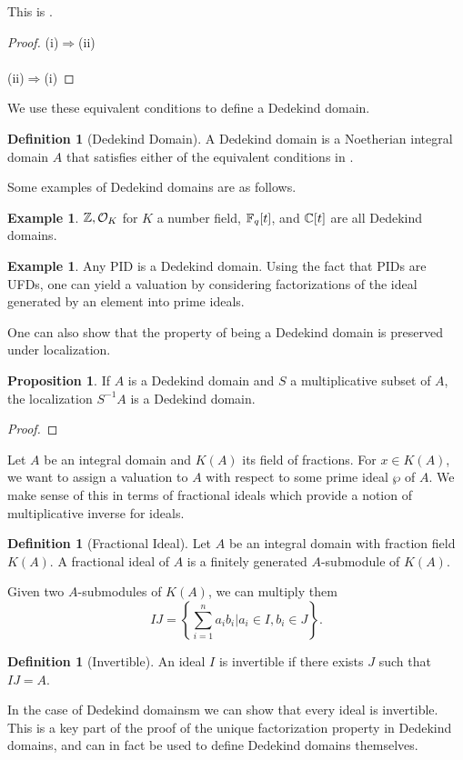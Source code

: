\documentclass{amsart}
\theoremstyle{definition}
\newtheorem{example}[theorem]{Example}
\newtheorem{proposition}[theorem]{Proposition}
\newtheorem{definition}[theorem]{Definition}
\numberwithin{equation}{section}
\begin{document}
This is \cite[Ch. 1, \S 1, Prop. 4]{Serre}. 
\begin{proof}
  (i)$\Longrightarrow$(ii)
  \\\\
  (ii)$\Longrightarrow$(i)
\end{proof}
We use these equivalent conditions to define a Dedekind domain. 
\begin{definition}[Dedekind Domain]
  A Dedekind domain is a Noetherian integral domain $A$ that satisfies either of the equivalent conditions in . 
\end{definition}
Some examples of Dedekind domains are as follows. 
\begin{example}
  $\mathbb{Z}, \mathcal{O}_{K}$ for $K$ a number field, $\mathbb{F}_{q}[t]$, and $\mathbb{C}[t]$ are all Dedekind domains. 
\end{example}
\begin{example}
  Any PID is a Dedekind domain. Using the fact that PIDs are UFDs, one can yield a valuation by considering factorizations of the ideal generated by an element into prime ideals. 
\end{example}
One can also show that the property of being a Dedekind domain is preserved under localization. 
\begin{proposition}
  If $A$ is a Dedekind domain and $S$ a multiplicative subset of $A$, the localization $S^{-1}A$ is a Dedekind domain. 
\end{proposition}
\begin{proof}
  
\end{proof}
Let $A$ be an integral domain and $K(A)$ its field of fractions. For $x\in K(A)$, we want to assign a valuation to $A$ with respect to some prime ideal $\wp$ of $A$. We make sense of this in terms of fractional ideals which provide a notion of multiplicative inverse for ideals. 
\begin{definition}[Fractional Ideal]
  Let $A$ be an integral domain with fraction field $K(A)$. A fractional ideal of $A$ is a finitely generated $A$-submodule of $K(A)$. 
\end{definition}
Given two $A$-submodules of $K(A)$, we can multiply them 
$$IJ=\left\{\sum_{i=1}^{n}a_{i}b_{i}|a_{i}\in I,b_{i}\in J\right\}.$$
\begin{definition}[Invertible]
  An ideal $I$ is invertible if there exists $J$ such that $IJ=A$. 
\end{definition}
In the case of Dedekind domainsm we can show that every ideal is invertible. This is a key part of the proof of the unique factorization property in Dedekind domains, and can in fact be used to define Dedekind domains themselves. 
\end{document}
